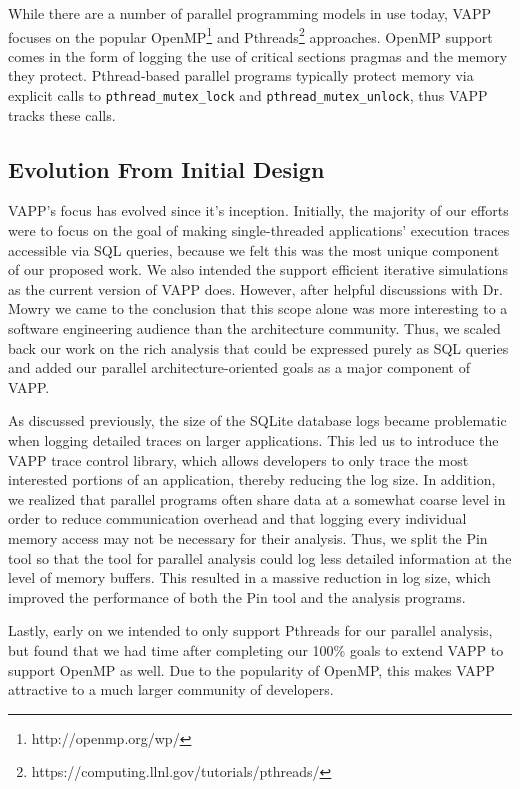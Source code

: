 While there are a number of parallel programming models in use today,
VAPP focuses on the popular OpenMP\footnote{http://openmp.org/wp/}
and Pthreads\footnote{https://computing.llnl.gov/tutorials/pthreads/}
approaches.  OpenMP support comes in the form of logging
the use of critical sections pragmas and the memory they protect.
Pthread-based parallel programs typically protect memory
via explicit calls to \texttt{pthread\_mutex\_lock} and
\texttt{pthread\_mutex\_unlock}, thus VAPP tracks these calls.


\subsection{Evolution From Initial Design}
VAPP's focus has evolved since it's inception.  Initially, the
majority of our efforts were to focus on the goal of making
single-threaded applications' execution traces accessible via
SQL queries, because we felt this was the most unique component
of our proposed work.  We also intended the support
efficient iterative simulations as the current version of VAPP does.
However, after helpful discussions with Dr. Mowry we came to
the conclusion that this scope alone was more interesting
to a software engineering audience than the architecture community.
Thus, we scaled back our work on the rich analysis that could be
expressed purely as SQL queries and added our parallel architecture-oriented
goals as a major component of VAPP.

As discussed previously, the size of the SQLite database logs became
problematic when logging detailed traces on larger applications.
This led us to introduce the VAPP trace control library, which
allows developers to only trace the most interested portions of
an application, thereby reducing the log size.  In addition,
we realized that parallel programs often share data at a somewhat
coarse level in order to reduce communication overhead and that
logging every individual memory access may not be necessary for
their analysis.  Thus, we split the Pin tool so that the tool
for parallel analysis could log less detailed information at the
level of memory buffers.  This resulted in a massive reduction in
log size, which improved the performance of both the Pin tool
and the analysis programs.

Lastly, early on we intended to only support Pthreads for our parallel analysis,
but found that we had time after completing our 100\% goals to extend
VAPP to support OpenMP as well.  Due to the popularity of OpenMP,
this makes VAPP attractive to a much larger community of
developers.
